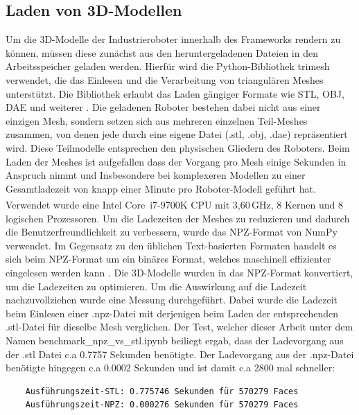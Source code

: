\subsection{Laden von 3D-Modellen}
Um die 3D-Modelle der Industrieroboter innerhalb des Frameworks rendern zu können,
müssen diese zunächst aus den heruntergeladenen Dateien in den Arbeitsspeicher geladen werden.
Hierfür wird die Python-Bibliothek trimesh verwendet, die das Einlesen und die Verarbeitung von triangulären Meshes unterstützt.
Die Bibliothek erlaubt das Laden gängiger Formate wie STL, OBJ, DAE und weiterer .
Die geladenen Roboter bestehen dabei nicht aus einer einzigen Mesh,
sondern setzen sich aus mehreren einzelnen Teil-Meshes zusammen, von denen jede durch eine eigene Datei (.stl, .obj, .dae) repräsentiert wird.
Diese Teilmodelle entsprechen den physischen Gliedern des Roboters.
Beim Laden der Meshes ist aufgefallen dass der Vorgang pro Mesh einige Sekunden in Anspruch nimmt und Insbesondere bei komplexeren Modellen
zu einer Gesamtladezeit von knapp einer Minute pro Roboter-Modell geführt hat.
Verwendet wurde eine Intel\textsuperscript{\textregistered} Core\texttrademark\ i7-9700K CPU mit 3,60\,GHz, 8 Kernen und 8 logischen Prozessoren.
Um die Ladezeiten der Meshes zu reduzieren und dadurch die Benutzerfreundlichkeit zu verbessern, wurde das NPZ-Format von NumPy verwendet.
Im Gegensatz zu den üblichen Text-basierten Formaten handelt es sich beim NPZ-Format um ein binäres Format,
welches maschinell effizienter eingelesen werden kann .
Die 3D-Modelle wurden in das NPZ-Format konvertiert, um die Ladezeiten zu optimieren.
Um die Auswirkung auf die Ladezeit nachzuvollziehen wurde eine Messung durchgeführt.
Dabei wurde die Ladezeit beim Einlesen einer .npz-Datei mit derjenigen beim Laden der entsprechenden .stl-Datei für dieselbe Mesh verglichen.
Der Test, welcher dieser Arbeit unter dem Namen benchmark\_npz\_vs\_stl.ipynb beiliegt ergab, dass der Ladevorgang aus der .stl Datei
c.a 0.7757 Sekunden benötigte. Der Ladevorgang aus der .npz-Datei benötigte hingegen c.a 0.0002 Sekunden und ist damit c.a 2800 mal schneller:

\begin{center}
    \begin{verbatim}
    Ausführungszeit-STL: 0.775746 Sekunden für 570279 Faces
    Ausführungszeit-NPZ: 0.000276 Sekunden für 570279 Faces
    \end{verbatim}
\end{center}

